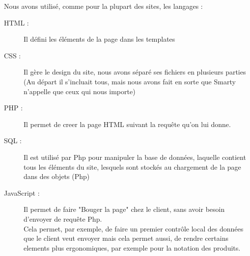 
Nous avons utilisé, comme pour la plupart des sites, les langages :
\begin{description}
	\item[HTML :] Il défini les éléments de la page dans les templates	
	\item[CSS :] Il gère le design du site, nous avons séparé ses fichiers en plusieurs parties (Au départ il s'incluait tous, mais nous avons fait en sorte que Smarty n'appelle que ceux qui nous importe)
	\item[PHP :] Il permet de creer la page HTML suivant la requête qu'on lui donne.	
	\item[SQL :] Il est utilisé par Php pour manipuler la base de données, laquelle contient tous les éléments du site, lesquels sont stockés au chargement de la page dans des objets (Php)	
	\item[JavaScript :] Il permet de faire "Bouger la page" chez le client, sans avoir besoin d'envoyer de requête Php.\\
	Cela permet, par exemple, de faire un premier contrôle local des données que le client veut envoyer mais cela permet aussi, de rendre certains elements plus ergonomiques, par exemple pour la notation des produits.
\end{description}